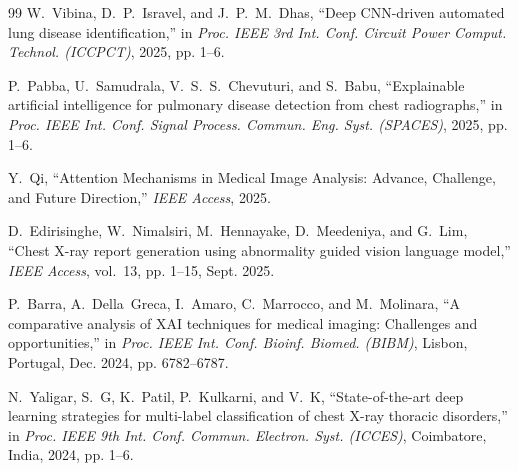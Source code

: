 \documentclass[journal]{IEEEtran}
\begin{document}
\begin{thebibliography}{99}
W.~Vibina, D.~P.~Isravel, and J.~P.~M.~Dhas, ``Deep CNN-driven automated lung disease identification,'' in \emph{Proc. IEEE 3rd Int. Conf. Circuit Power Comput. Technol. (ICCPCT)}, 2025, pp. 1--6.

P.~Pabba, U.~Samudrala, V.~S.~S.~Chevuturi, and S.~Babu, ``Explainable artificial intelligence for pulmonary disease detection from chest radiographs,'' in \emph{Proc. IEEE Int. Conf. Signal Process. Commun. Eng. Syst. (SPACES)}, 2025, pp. 1--6.

Y.~Qi, ``Attention Mechanisms in Medical Image Analysis: Advance, Challenge, and Future Direction,'' \emph{IEEE Access}, 2025.

D.~Edirisinghe, W.~Nimalsiri, M.~Hennayake, D.~Meedeniya, and G.~Lim, ``Chest X-ray report generation using abnormality guided vision language model,'' \emph{IEEE Access}, vol.~13, pp. 1--15, Sept. 2025.

P.~Barra, A.~Della~Greca, I.~Amaro, C.~Marrocco, and M.~Molinara, ``A comparative analysis of XAI techniques for medical imaging: Challenges and opportunities,'' in \emph{Proc. IEEE Int. Conf. Bioinf. Biomed. (BIBM)}, Lisbon, Portugal, Dec. 2024, pp. 6782--6787.

N.~Yaligar, S.~G, K.~Patil, P.~Kulkarni, and V.~K, ``State-of-the-art deep learning strategies for multi-label classification of chest X-ray thoracic disorders,'' in \emph{Proc. IEEE 9th Int. Conf. Commun. Electron. Syst. (ICCES)}, Coimbatore, India, 2024, pp. 1--6.

\end{thebibliography}
\end{document}
